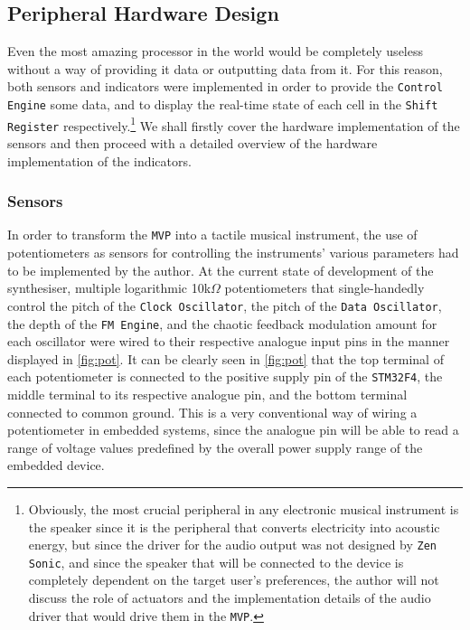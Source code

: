 \documentclass[12pt]{article}
\begin{document}
\subsection{Peripheral Hardware Design}
Even the most amazing processor in the world would be completely useless without a way of providing it data or outputting data from it. For this reason, both sensors and indicators were implemented in order to provide the \texttt{Control Engine} some data, and to display the real-time state of each cell in the \texttt{Shift Register} respectively.\footnote{Obviously, the most crucial peripheral in any electronic musical instrument is the speaker since it is the peripheral that converts electricity into acoustic energy, but since the driver for the audio output was not designed by \texttt{Zen Sonic}, and since the speaker that will be connected to the device is completely dependent on the target user's preferences, the author will not discuss the role of actuators and the implementation details of the audio driver that would drive them in the \texttt{MVP}.} We shall firstly cover the hardware implementation of the sensors and then proceed with a detailed overview of the hardware implementation of the indicators. 
\subsubsection{Sensors}
In order to transform the \texttt{MVP} into a tactile musical instrument, the use of potentiometers as sensors for controlling the instruments' various parameters had to be implemented by the author. At the current state of development of the synthesiser, multiple logarithmic 10k$\Omega$ potentiometers that single-handedly control the pitch of the \texttt{Clock Oscillator}, the pitch of the \texttt{Data Oscillator}, the depth of the \texttt{FM Engine}, and the chaotic feedback modulation amount for each oscillator were wired to their respective analogue input pins in the manner displayed in \autoref{fig:pot}. It can be clearly seen in \autoref{fig:pot} that the top terminal of each potentiometer is connected to the positive supply pin of the \texttt{STM32F4}, the middle terminal to its respective analogue pin, and the bottom terminal connected to common ground. This is a very conventional way of wiring a potentiometer in embedded systems, since the analogue pin will be able to read a range of voltage values predefined by the overall power supply range of the embedded device.
\end{document}
